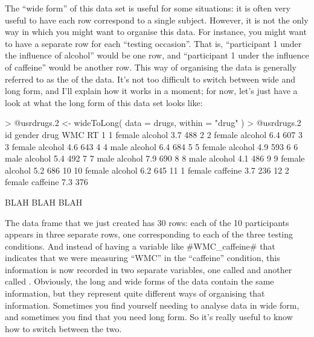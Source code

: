 
The ``wide form'' of this data set is useful for some situations: it is often very useful to have each row correspond to a single subject. However, it is not the only way in which you might want to organise this data. For instance, you might want to have a separate row for each ``testing occasion''. That is, ``participant 1 under the influence of alcohol'' would be one row, and ``participant 1 under the influence of caffeine'' would be another row. This way of organising the data is generally referred to as the  of the data. It's not too difficult to switch between wide and long form, and I'll explain how it works in a moment; for now, let's just have a look at what the long form of this data set looks like:
\begin{rblock1}
> @usr{drugs.2 <- wideToLong( data = drugs, within = "drug" )}
> @usr{drugs.2}
   id gender     drug WMC  RT
1   1 female  alcohol 3.7 488
2   2 female  alcohol 6.4 607
3   3 female  alcohol 4.6 643
4   4   male  alcohol 6.4 684
5   5 female  alcohol 4.9 593
6   6   male  alcohol 5.4 492
7   7   male  alcohol 7.9 690
8   8   male  alcohol 4.1 486
9   9 female  alcohol 5.2 686
10 10 female  alcohol 6.2 645
11  1 female caffeine 3.7 236
12  2 female caffeine 7.3 376

BLAH BLAH BLAH
\end{rblock1}
The  data frame that we just created has 30 rows: each of the 10 participants appears in three separate rows, one corresponding to each of the three testing conditions. And instead of having a variable like \rtextverb#WMC_caffeine# that indicates that we were measuring ``WMC'' in the ``caffeine'' condition, this information is now recorded in two separate variables, one called  and another called . Obviously, the long and wide forms of the data contain the same information, but they represent quite different ways of organising that information. Sometimes you find yourself needing to analyse data in wide form, and sometimes you find that you need long form. So it's really useful to know how to switch between the two.

